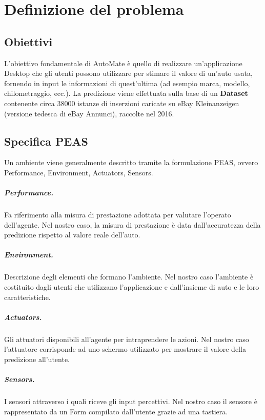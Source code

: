 \chapter{Definizione del problema}
\section{Obiettivi}
L'obiettivo fondamentale di AutoMate è quello di realizzare un'applicazione Desktop che gli utenti possono utilizzare per stimare il valore di un'auto usata, fornendo in input le informazioni di quest'ultima (ad esempio marca, modello, chilometraggio, ecc.). La predizione viene effettuata sulla base di un \textbf{Dataset} contenente circa 38000 istanze di inserzioni caricate su eBay Kleinanzeigen (versione tedesca di eBay Annunci), raccolte nel 2016.
\medskip
\section{Specifica PEAS}
Un ambiente viene generalmente descritto tramite la formulazione PEAS, ovvero 
Performance, Environment, Actuators, Sensors.
\paragraph{Performance.} Fa riferimento alla misura di prestazione adottata per valutare l'operato dell'agente. Nel nostro caso, la misura di prestazione è data dall'accuratezza della predizione rispetto al valore reale dell'auto.
\paragraph{Environment.} Descrizione degli elementi che formano l'ambiente. Nel nostro caso l'ambiente è costituito dagli utenti che utilizzano l'applicazione e dall'insieme di auto e le loro caratteristiche.
\paragraph{Actuators.} Gli attuatori disponibili all'agente per intraprendere le azioni. Nel nostro caso l'attuatore corrisponde ad uno schermo utilizzato per mostrare il valore della predizione all'utente.
\paragraph{Sensors.} I sensori attraverso i quali riceve gli input percettivi. Nel nostro caso il sensore è rappresentato da un Form compilato dall'utente grazie ad una tastiera.
